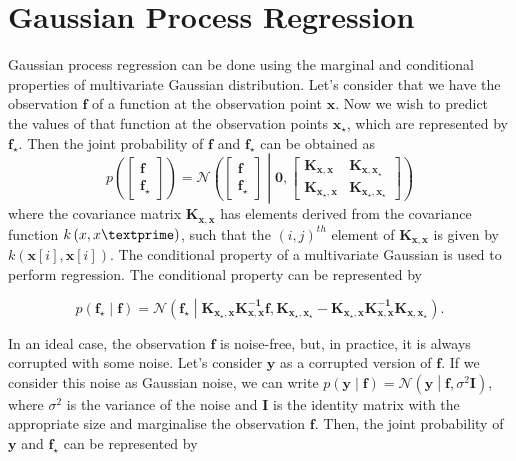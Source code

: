 \section{Gaussian Process Regression}
Gaussian process regression can be done using the marginal and conditional properties of multivariate Gaussian distribution. Let's consider that we have the observation $\mathbf{f}$ of a function at the observation point $\mathbf{x}$. Now we wish to predict the values of that function at the observation points $\mathbf{x_\star}$, which are represented by $\mathbf{f_\star}$. Then the joint probability of $\mathbf{f}$ and $\mathbf{f_\star}$ can be obtained as 
\begin{equation} \label{eq:jointPro_f_f*}
p \left( \begin{bmatrix} \mathbf{f} \\\mathbf{f_\star} \end{bmatrix} \right) =
\mathcal{N}\left( \begin{bmatrix} \mathbf{f} \\\mathbf{f_\star} \end{bmatrix} \middle|
\mathbf{0}, \begin{bmatrix} \mathbf{K_{x,x}} & \mathbf{K_{x,x_\star}} \\
			    \mathbf{K_{x_\star,x}} & \mathbf{K_{x_\star,x_\star}} \end{bmatrix} \right)
\end{equation}
where the covariance matrix $ \mathbf{K_{x,x}}$ has elements derived from the covariance function $ k \left(x,x\textprime \right)$, such that the $ \left(i,j \right)^{th}$ element of $\mathbf{K_{x,x}}$ is given by $k \left( \mathbf{x} \left[ i\right],\mathbf{x} \left[ i\right] \right)$. The conditional property of a multivariate Gaussian is used to perform regression. The conditional property can be represented by

\begin{equation} \label{eq:condProMvG}
p \left( \mathbf{f_\star} \middle| \mathbf{f} \right) =
\mathcal{N}\left( \mathbf{f_\star} \middle| \mathbf{K_{x_\star,x}}  \mathbf{K^{-1}_{x,x}} \mathbf{f,} \mathbf{K_{x_\star,x_\star}} - 
\mathbf{K_{x_\star,x}} \mathbf{K^{-1}_{x,x}} \mathbf{K_{x,x_\star}}\right).
\end{equation}

In an ideal case, the observation $\mathbf{f}$ is noise-free, but, in practice, it is always corrupted with some noise. Let's consider $\mathbf{y}$ as a corrupted version of $\mathbf{f}$. If we consider this noise as Gaussian noise, we can write $p \left( \mathbf{y} \middle| \mathbf{f} \right) = \mathcal{N} \left( \mathbf{y} \middle| \mathbf{f}, \sigma^2 \mathbf{I} \right) $, where $ \sigma^2 $ is the variance of the noise and $\mathbf{I}$ is the identity matrix with the appropriate size and marginalise the observation $\mathbf{f}$. Then, the joint probability of $\mathbf{y}$ and $\mathbf{f_\star}$ can be represented by 

